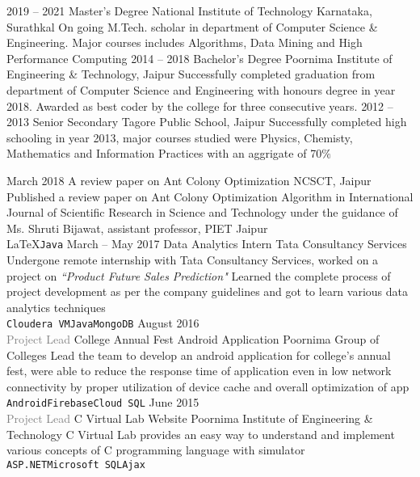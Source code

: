 \documentclass[9pt]{myOwnClass}
\begin{document}

\begin{entrylist}
	\entry
		{2019 -- 2021}
		{Master's Degree}
		{National Institute of Technology Karnataka, Surathkal}
		{On going M.Tech. scholar in department of Computer Science \& Engineering. Major courses includes Algorithms, Data Mining and High Performance Computing}
	\entry
		{2014 -- 2018}
		{Bachelor's Degree}
		{Poornima Institute of Engineering \& Technology, Jaipur}
		{Successfully completed graduation from department of Computer Science and Engineering with honours degree in year 2018. Awarded as best coder by the college for three consecutive years.}
	\entry
		{2012 -- 2013}
		{Senior Secondary}
		{Tagore Public School, Jaipur}
		{Successfully completed high schooling in year 2013, major courses studied were Physics, Chemisty, Mathematics and Information Practices with an aggrigate of 70$\%$}
\end{entrylist}


\begin{entrylist}
	\entry
		{March 2018}
		{A review paper on Ant Colony Optimization}
		{NCSCT, Jaipur}
		{Published a review paper on Ant Colony Optimization Algorithm in International Journal of Scientific Research in Science and Technology under the guidance of Ms. Shruti Bijawat, assistant professor, PIET Jaipur\\ \LaTeX\slashsep\texttt{Java}}
	\entry
		{March -- May 2017}
		{Data Analytics Intern}
		{Tata Consultancy Services}
		{Undergone remote internship with Tata Consultancy Services, worked on a project on \textit{``Product Future Sales Prediction"} Learned the complete process of project development as per the company guidelines and got to learn various data analytics techniques\\ \texttt{Cloudera VM}\slashsep\texttt{Java}\slashsep\texttt{MongoDB}}
	\entry
		{August 2016\\\footnotesize{\textcolor{gray}{Project Lead}}}
		{College Annual Fest Android Application}
		{Poornima Group of Colleges}
		{Lead the team to develop an android application for college's annual fest, were able to reduce the response time of application even in low network connectivity by proper utilization of device cache and overall optimization of app\\ \texttt{Android}\slashsep\texttt{Firebase}\slashsep\texttt{Cloud SQL}}
		\entry
		{June 2015\\\footnotesize{\textcolor{gray}{Project Lead}}}
		{C Virtual Lab Website}
		{Poornima Institute of Engineering \& Technology}
		{C Virtual Lab provides an easy way to understand and implement various concepts of C programming language with simulator\\ \texttt{ASP.NET}\slashsep\texttt{Microsoft SQL}\slashsep\texttt{Ajax}}
\end{entrylist}
\end{document}
